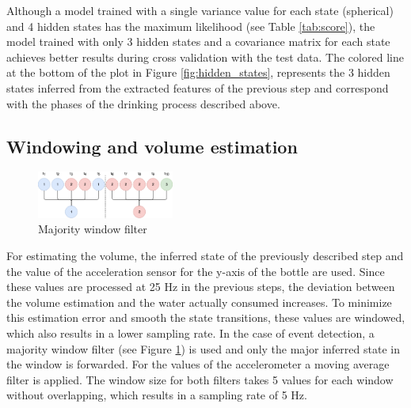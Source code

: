 Although a model trained with a single variance value for each state (spherical) and 4 hidden states has the maximum likelihood (see Table \ref{tab:score}), the model trained with only 3 hidden states and a covariance matrix for each state achieves better results during cross validation with the test data. The colored line at the bottom of the plot in Figure \ref{fig:hidden_states}, represents the 3 hidden states inferred from the extracted features of the previous step and correspond with the phases of the drinking process described above.


\subsection{Windowing and volume estimation}
\begin{figure}
\centering
\includegraphics[width=0.4\textwidth]{assets/windowing.png}
\caption{Majority window filter}
\label{fig:windowing}
\end{figure}
For estimating the volume, the inferred state of the previously described step and the value of the acceleration sensor for the y-axis of the bottle are used. Since these values are processed at 25 Hz in the previous steps, the deviation between the volume estimation and the water actually consumed increases. To minimize this estimation error and smooth the state transitions, these values are windowed, which also results in a lower sampling rate. In the case of event detection, a majority window filter (see Figure \ref{fig:windowing}) is used and only the major inferred state in the window is forwarded. For the values of the accelerometer a moving average filter is applied. The window size for both filters takes 5 values for each window without overlapping, which results in a sampling rate of 5 Hz.\\

